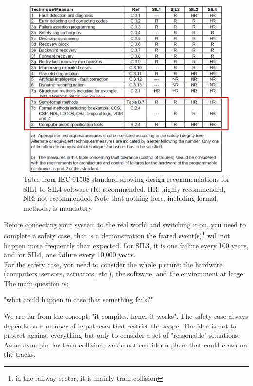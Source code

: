 \begin{figure}[h]
\centering\includegraphics[scale=0.5]{Pictures/chapterSafetyPrinciples/SAFETY-61508A-2.png}
\caption{Table from IEC 61508 standard showing design recommendations for SIL1 to SIL4 software (R: recommended, HR: highly recommended, NR: not recommended. Note that nothing here, including formal methods, is mandatory}
\end{figure}

Before connecting your system to the real world and switching it on, you need to complete a safety case, that is a demonstration the feared event(s)\footnote{in the railway sector, it is mainly train collision} will not happen more frequently than expected. For SIL3, it is one failure every 100 years, and for SIL4, one failure every 10,000 years. \\ 

For the safety case, you need to consider the whole picture: the hardware (computers, sensors, actuators, etc.), the software, and the environment at large. The main question is: 
\begin{center}
    "what could happen in case that something fails?"
\end{center}
We are far from the concept: "it compiles, hence it works". The safety case always depends on a number of hypotheses that restrict the scope. The idea is not to protect against everything but only to consider a set of "reasonable" situations. As an example, for train collision, we do not consider a plane that could crash on the tracks.\\

